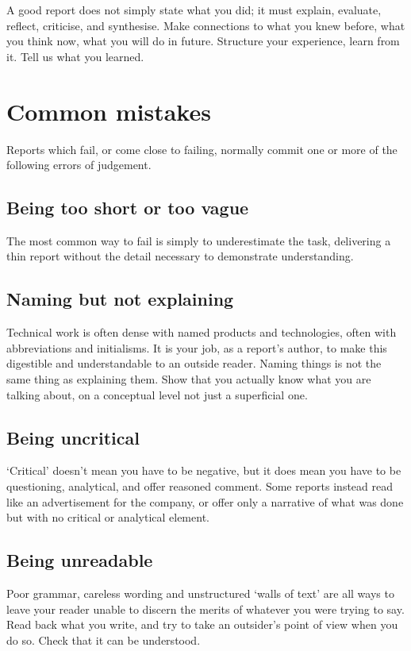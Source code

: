 \documentclass[12pt,a4paper,twoside,openright]{report}
\begin{document}
A good report does not simply state what you did; it must explain, evaluate, reflect,
criticise, and synthesise. Make connections to what you knew before, what you think now, what you will do in future. Structure your experience, learn from it. Tell us what you learned.

\section{Common mistakes}

Reports which fail, or come close to failing, normally commit one or more of the following errors of judgement.

\subsection{Being too short or too vague}

The most common way to fail is simply to underestimate the task,
delivering a thin report without the detail necessary to demonstrate understanding.

\subsection{Naming but not explaining}

Technical work is often dense with named products and technologies,
often with abbreviations and initialisms. It is your job, as a report's author,
to make this digestible and understandable to an outside reader.
Naming things is not the same thing as explaining them.
Show that you actually know what you are talking about,
on a conceptual level not just a superficial one.

\subsection{Being uncritical}

`Critical' doesn't mean you have to be negative,
but it does mean you have to be questioning,
analytical, and offer reasoned comment.
Some reports instead read like an advertisement for the company,
or offer only a narrative of what was done but with no critical or analytical element.

\subsection{Being unreadable}

Poor grammar, careless wording and unstructured `walls of text' are all ways
to leave your reader unable to discern the merits of whatever you were trying to say.
Read back what you write, and try to take an outsider's point of view when you do so.
Check that it can be understood.
\end{document}
